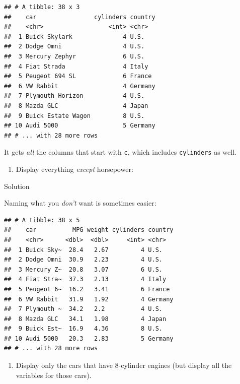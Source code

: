 \documentclass[]{tufte-book}
\newenvironment{Shaded}{}{}
\newcommand{\KeywordTok}[1]{\textcolor[rgb]{0.00,0.44,0.13}{\textbf{#1}}}
\newcommand{\NormalTok}[1]{#1}
\newcommand{\OperatorTok}[1]{\textcolor[rgb]{0.40,0.40,0.40}{#1}}
\newcommand{\StringTok}[1]{\textcolor[rgb]{0.25,0.44,0.63}{#1}}
\providecommand{\tightlist}{%
  \setlength{\itemsep}{0pt}\setlength{\parskip}{0pt}}
\theoremstyle{definition}
\theoremstyle{definition}
\theoremstyle{definition}
\theoremstyle{remark}
\begin{document}
\begin{verbatim}
## # A tibble: 38 x 3
##    car                cylinders country
##    <chr>                  <int> <chr>  
##  1 Buick Skylark              4 U.S.   
##  2 Dodge Omni                 4 U.S.   
##  3 Mercury Zephyr             6 U.S.   
##  4 Fiat Strada                4 Italy  
##  5 Peugeot 694 SL             6 France 
##  6 VW Rabbit                  4 Germany
##  7 Plymouth Horizon           4 U.S.   
##  8 Mazda GLC                  4 Japan  
##  9 Buick Estate Wagon         8 U.S.   
## 10 Audi 5000                  5 Germany
## # ... with 28 more rows
\end{verbatim}

It gets \emph{all} the columns that start with \texttt{c}, which
includes \texttt{cylinders} as well.

\begin{enumerate}
\def\labelenumi{(\alph{enumi})}
\setcounter{enumi}{2}
\tightlist
\item
  Display everything \emph{except} horsepower:
\end{enumerate}

Solution

Naming what you \emph{don't} want is sometimes easier:

\begin{Shaded}
\end{Shaded}

\begin{verbatim}
## # A tibble: 38 x 5
##    car          MPG weight cylinders country
##    <chr>      <dbl>  <dbl>     <int> <chr>  
##  1 Buick Sky~  28.4   2.67         4 U.S.   
##  2 Dodge Omni  30.9   2.23         4 U.S.   
##  3 Mercury Z~  20.8   3.07         6 U.S.   
##  4 Fiat Stra~  37.3   2.13         4 Italy  
##  5 Peugeot 6~  16.2   3.41         6 France 
##  6 VW Rabbit   31.9   1.92         4 Germany
##  7 Plymouth ~  34.2   2.2          4 U.S.   
##  8 Mazda GLC   34.1   1.98         4 Japan  
##  9 Buick Est~  16.9   4.36         8 U.S.   
## 10 Audi 5000   20.3   2.83         5 Germany
## # ... with 28 more rows
\end{verbatim}

\begin{enumerate}
\def\labelenumi{(\alph{enumi})}
\setcounter{enumi}{3}
\tightlist
\item
  Display only the cars that have 8-cylinder engines (but display all
  the variables for those cars).
\end{enumerate}
\end{document}
